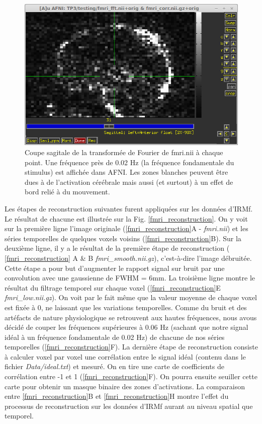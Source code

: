 \documentclass[a4paper]{article}
\begin{document}
\begin{figure}
   \centering
   \includegraphics[width=.7\textwidth]{fmri_fft}
      \caption{\label{fmri_fft} Coupe sagitale de la transformée de Fourier de fmri.nii à chaque point. Une fréquence près de 0.02 Hz (la fréquence fondamentale du stimulus) est affichée dans AFNI. Les zones blanches peuvent être dues à de l'activation cérébrale mais aussi (et surtout) à un effet de bord relié à du mouvement.}
\end{figure}

Les étapes de reconstruction suivantes furent appliquées sur les données d'IRMf. Le résultat de chacune est illustrée sur la Fig. \ref{fmri_reconstruction}. On y voit sur la première ligne l'image originale (\ref{fmri_reconstruction}A - \emph{fmri.nii}) et les séries temporelles de quelques voxels voisins (\ref{fmri_reconstruction}B). Sur la deuxième ligne, il y a le résultat de la première étape de reconstruction ( \ref{fmri_reconstruction} A \& B \emph{fmri\_smooth.nii.gz}), c'est-à-dire l'image débruitée. Cette étape a pour but d'augmenter le rapport signal sur bruit par une convolution avec une gaussienne de FWHM = 6mm.
La troisième ligne montre le résultat du filtrage temporel sur chaque voxel (\ref{fmri_reconstruction}E \emph{fmri\_low.nii.gz}). On voit par le fait même que la valeur moyenne de chaque voxel est fixée à 0, ne laissant que les variations temporelles. Comme du bruit et des artéfacts de nature physiologique se retrouvent aux hautes fréquences, nous avous décidé de couper les fréquences supérieures à 0.06 Hz (sachant que notre signal idéal à un fréquence fondamentale de 0.02 Hz) de chacune de nos séries temporelles (\ref{fmri_reconstruction}F).
La dernière étape de reconstruction consiste à calculer voxel par voxel une corrélation entre le signal idéal (contenu dans le fichier \emph{Data/ideal.txt}) et mesuré.  On en tire une carte de coefficients de corrélation entre -1 et 1 (\ref{fmri_reconstruction}F). On pourra ensuite seuiller cette carte pour obtenir un masque binaire des zones d'activations. La comparaison entre \ref{fmri_reconstruction}B et \ref{fmri_reconstruction}H montre l'effet du processus de reconstruction sur les données d'IRMf aurant au niveau spatial que temporel.
\end{document}

